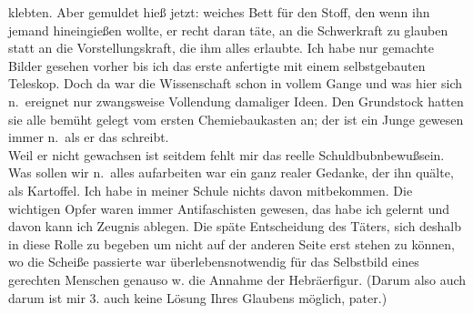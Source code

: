 \documentclass[
]{article}
\begin{document}
klebten. Aber gemuldet hieß jetzt: weiches Bett für den Stoff, den wenn
ihn jemand hineingießen wollte, er recht daran täte, an die Schwerkraft
zu glauben statt an die Vorstellungskraft, die ihm alles erlaubte. Ich
habe nur gemachte Bilder gesehen vorher bis ich das erste anfertigte mit
einem selbstgebauten Teleskop. Doch da war die Wissenschaft schon in
vollem Gange und was hier sich n.~ereignet nur zwangsweise Vollendung
damaliger Ideen. Den Grundstock hatten sie alle bemüht gelegt vom ersten
Chemiebaukasten an; der ist ein Junge gewesen immer n.~als er das
schreibt.\\
Weil er nicht gewachsen ist seitdem fehlt mir das reelle
Schuldbubnbewußsein. Was sollen wir n.~alles aufarbeiten war ein ganz
realer Gedanke, der ihn quälte, als Kartoffel. Ich habe in meiner Schule
nichts davon mitbekommen. Die wichtigen Opfer waren immer Antifaschisten
gewesen, das habe ich gelernt und davon kann ich Zeugnis ablegen. Die
späte Entscheidung des Täters, sich deshalb in diese Rolle zu begeben um
nicht auf der anderen Seite erst stehen zu können, wo die Scheiße
passierte war überlebensnotwendig für das Selbstbild eines gerechten
Menschen genauso w. die Annahme der Hebräerfigur. (Darum also auch darum
ist mir 3. auch keine Lösung Ihres Glaubens möglich, pater.)
\end{document}
